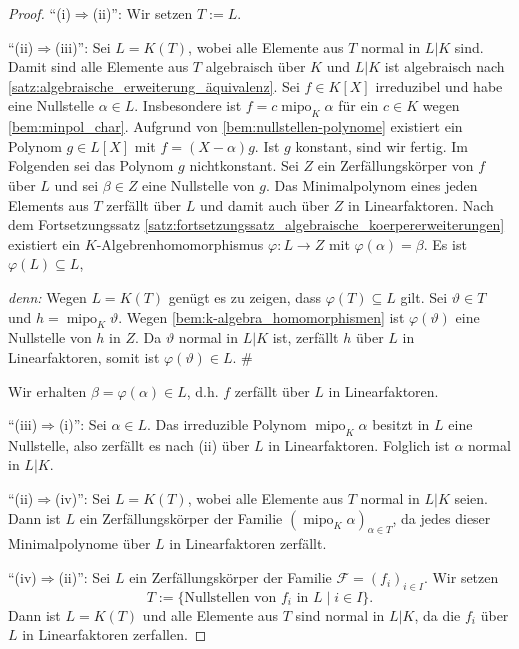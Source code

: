\documentclass[a4paper, twoside, 11pt, ngerman]{report}
\newcommand{\calF}{\mathcal F}
\DeclareMathOperator{\mipo}{mipo}
\theoremstyle{definistyle}
\theoremstyle{remark}
\newenvironment{denn}%
  {\par\textit{denn:}}%
  {\hfill\#\par}
\begin{document}
\begin{proof}
"`(i)$\Rightarrow$(ii)"': Wir setzen $T:=L$.

"`(ii)$\Rightarrow$(iii)"': Sei $L = K(T)$, wobei alle Elemente aus $T$ normal in $L|K$ sind.
Damit sind alle Elemente aus $T$ algebraisch über $K$ und $L|K$ ist algebraisch nach \ref{satz:algebraische_erweiterung_äquivalenz}. Sei $f \in K[X]$ irreduzibel und habe eine Nullstelle $\alpha \in L$. Insbesondere ist $f = c\mipo_K\alpha$ für ein $c\in K$ wegen \ref{bem:minpol_char}. Aufgrund von \ref{bem:nullstellen-polynome} existiert ein Polynom $g \in L[X]$ mit $f = (X-\alpha)g$. Ist $g$ konstant, sind wir fertig. Im Folgenden sei das Polynom $g$ nichtkonstant. Sei $Z$ ein Zerfällungskörper von $f$ über $L$ und sei $\beta\in Z$ eine
Nullstelle von $g$. Das Minimalpolynom eines jeden Elements aus $T$ zerfällt über $L$ und damit auch über $Z$ in Linearfaktoren. Nach dem Fortsetzungssatz \ref{satz:fortsetzungssatz_algebraische_koerpererweiterungen} existiert ein $K$-Algebren\-homomorphismus $\varphi \colon L \to Z$ mit $\varphi(\alpha) = \beta$.
Es ist $\varphi(L) \subseteq L$,
\begin{denn}
Wegen $L = K(T)$ genügt es zu zeigen, dass $\varphi(T) \subseteq L$ gilt.  
Sei $\vartheta \in T$ und $h = \mipo_K\vartheta$. Wegen \ref{bem:k-algebra_homomorphismen} ist $\varphi(\vartheta)$ eine Nullstelle von $h$ in $Z$. Da $\vartheta$ normal in $L|K$ ist, zerfällt $h$ über $L$ in Linearfaktoren, somit ist $\varphi(\vartheta) \in L$.    
\end{denn}
Wir erhalten $\beta = \varphi(\alpha) \in L$, d.h. $f$ zerfällt über $L$ in Linearfaktoren.

"`(iii)$\Rightarrow$(i)"':  
Sei $\alpha \in L$. Das irreduzible Polynom $\mipo_K\alpha$ besitzt in $L$ eine Nullstelle, also zerfällt es nach (ii) über $L$ in Linearfaktoren. Folglich ist $\alpha$ normal in $L|K$.

"`(ii)$\Rightarrow$(iv)"':  
Sei $L=K(T)$, wobei alle Elemente aus $T$ normal in $L|K$ seien.  
Dann ist $L$ ein Zerfällungskörper der Familie $(\mipo_K\alpha)_{\alpha \in T}$, da jedes dieser Minimalpolynome über $L$ in Linearfaktoren zerfällt.

"`(iv)$\Rightarrow$(ii)"':  
Sei $L$ ein Zerfällungskörper der Familie $\calF=(f_i)_{i \in I}$.  
Wir setzen \[T := \{\text{Nullstellen von } f_i \text{ in } L \mid i\in I\}.\] Dann ist $L = K(T)$ und alle Elemente aus $T$ sind normal in $L|K$, da die $f_i$ über $L$ in Linearfaktoren zerfallen.
\end{proof}
\end{document}
